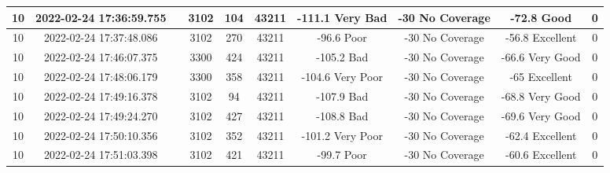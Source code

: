 \begin{longtable*}{|c|c|c|c|c|c|c|c|c|c|}
10&2022-02-24 17:36:59.755&&3102&104&43211& -111.1    Very Bad    & -30       No Coverage & -72.8     Good        & 0\\\hline
{}10&2022-02-24 17:37:48.086&&3102&270&43211& -96.6     Poor        & -30       No Coverage & -56.8     Excellent   & 0\\\hline
{}10&2022-02-24 17:46:07.375&&3300&424&43211& -105.2    Bad         & -30       No Coverage & -66.6     Very Good   & 0\\\hline
{}10&2022-02-24 17:48:06.179&&3300&358&43211& -104.6    Very Poor   & -30       No Coverage & -65       Excellent   & 0\\\hline
{}10&2022-02-24 17:49:16.378&&3102&94&43211& -107.9    Bad         & -30       No Coverage & -68.8     Very Good   & 0\\\hline
{}10&2022-02-24 17:49:24.270&&3102&427&43211& -108.8    Bad         & -30       No Coverage & -69.6     Very Good   & 0\\\hline
{}10&2022-02-24 17:50:10.356&&3102&352&43211& -101.2    Very Poor   & -30       No Coverage & -62.4     Excellent   & 0\\\hline
{}10&2022-02-24 17:51:03.398&&3102&421&43211& -99.7     Poor        & -30       No Coverage & -60.6     Excellent   & 0\\\hline

\end{longtable*}
